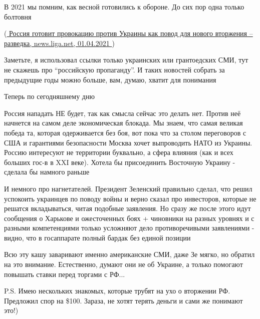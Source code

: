 В 2021 мы помним, как весной готовились к обороне. До сих пор одна только
болтовня

(\href{https://news.liga.net/politics/news/rossiya-gotovit-provokatsiyu-dlya-vtorjeniya-svoih-regulyarnyh-voysk-na-donbass-razvedka}{%
Россия готовит провокацию против Украины как повод для нового вторжения – разведка, %
news.liga.net, 01.04.2021%
})

Заметьте, я использовал ссылки только украинских или грантоедских СМИ, тут не
скажешь про \enquote{российскую пропаганду}. И таких новостей собрать за
предыдущие годы можно больше, вам, думаю, хватит для понимания

Теперь по сегодняшнему дню

Россия нападать НЕ будет, так как смысла сейчас это делать нет. Против неё
начнется на самом деле экономическая блокада. Мы знаем, что самая великая
победа та, которая одерживается без боя, вот пока что за столом переговоров с
США и гарантиями безопасности Москва хочет выпроводить НАТО из Украины. Россию
интересуют не территории буквально, а сфера влияния (как и всех больших гос-в в
XXI веке). Хотела бы присоединить Восточную Украину - сделала бы намного раньше

И немного про нагнетателей. Президент Зеленский правильно сделал, что решил
успокоить украинцев по поводу войны и верно сказал про инвесторов, которые не
решатся вкладываться, читая подобные заявления. Но сразу же после этого идут
сообщения о Харькове и ожесточенных боях + чиновники на разных уровнях и с
разными компетенциями только усложняют дело противоречивыми заявлениями -
видно, что в госаппарате полный бардак без единой позиции

Всю эту кашу заваривают именно американские СМИ, даже Зе мягко, но обратил на
это внимание. Естественно, думают они не об Украине, а только помогают повышать
ставки перед торгами с РФ...

P.S. Имею нескольких знакомых, которые трубят на ухо о вторжении РФ. Предложил
спор на \$100. Зараза, не хотят терять деньги и сами же понимают это!)
